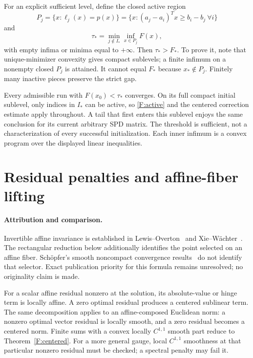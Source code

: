 For an explicit sufficient level, define the closed active region
\[
 P_j=\{x:\ell_j(x)=p(x)\}
 =\{x:(a_j-a_i)^Tx\ge b_i-b_j\ \forall i\}
\]
and
\begin{equation}\label{F:basin}
 \tau_* =\min_{j\notin I_*}\inf_{x\in P_j}F(x),
\end{equation}
with empty infima or minima equal to $+\infty$. Then $\tau_*>F_*$. To prove it, note that unique-minimizer convexity gives compact sublevels; a finite infimum on a nonempty closed $P_j$ is attained. It cannot equal $F_*$ because $x_*\notin P_j$. Finitely many inactive pieces preserve the strict gap.

Every admissible run with $F(x_0)<\tau_*$ converges. On its full compact initial sublevel, only indices in $I_*$ can be active, so \eqref{F:active} and the centered correction estimate apply throughout. A tail that first enters this sublevel enjoys the same conclusion for its current arbitrary SPD matrix. The threshold is sufficient, not a characterization of every successful initialization. Each inner infimum is a convex program over the displayed linear inequalities.

\section{Residual penalties and affine-fiber lifting}
\paragraph{Attribution and comparison.}
Invertible affine invariance is established in Lewis--Overton~\cite[Section~2]{LO} and Xie--W\"achter~\cite[Theorem~II.1]{XW}. The rectangular reduction below additionally identifies the point selected on an affine fiber. Sch\"opfer's smooth noncompact convergence results~\cite[Theorems 3.4 and 3.7]{S16} do not identify that selector. Exact publication priority for this formula remains unresolved; no originality claim is made.

For a scalar affine residual nonzero at the solution, its absolute-value or hinge term is locally affine. A zero optimal residual produces a centered sublinear term. The same decomposition applies to an affine-composed Euclidean norm: a nonzero optimal vector residual is locally smooth, and a zero residual becomes a centered norm. Finite sums with a convex locally $C^{1,1}$ smooth part reduce to Theorem~\ref{F:centered}. For a more general gauge, local $C^{1,1}$ smoothness at that particular nonzero residual must be checked; a spectral penalty may fail it.

